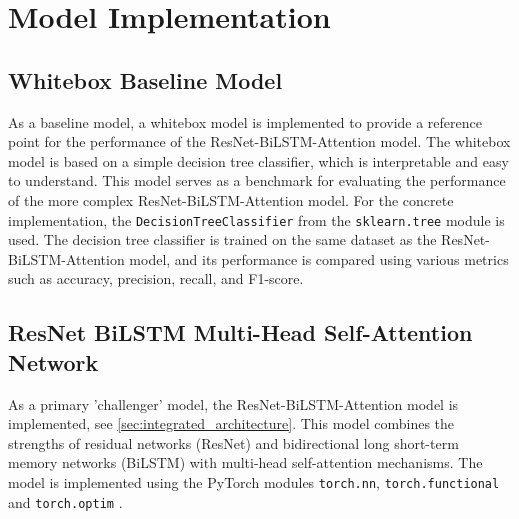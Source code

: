 \section{Model Implementation}

\subsection{Whitebox Baseline Model}
As a baseline model, a whitebox model is implemented to provide a reference point for the performance of the ResNet-BiLSTM-Attention model. The whitebox model is based on a simple decision tree classifier, which is interpretable and easy to understand. This model serves as a benchmark for evaluating the performance of the more complex ResNet-BiLSTM-Attention model. For the concrete implementation, the \texttt{DecisionTreeClassifier} from the \texttt{sklearn.tree} module is used. The decision tree classifier is trained on the same dataset as the ResNet-BiLSTM-Attention model, and its performance is compared using various metrics such as accuracy, precision, recall, and F1-score.


\subsection{ResNet BiLSTM Multi-Head Self-Attention Network}
As a primary 'challenger' model, the ResNet-BiLSTM-Attention model is implemented, see \autoref{sec:integrated_architecture}. This model combines the strengths of residual networks (ResNet) and bidirectional long short-term memory networks (BiLSTM) with multi-head self-attention mechanisms. The model is implemented using the PyTorch modules \texttt{torch.nn}, \texttt{torch.functional} and \texttt{torch.optim} \autocite{PyTorch}.

